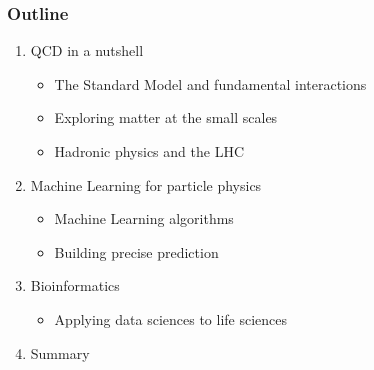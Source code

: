 \documentclass[aspectratio=43]{beamer}
\begin{document}
\begin{frame}

	\frametitle{Outline}
	
	\begin{enumerate}
		\item {\color{blue}QCD in a nutshell}
		\begin{itemize}
			\item The Standard Model and fundamental interactions
			\item Exploring matter at the small scales
			\item Hadronic physics and the LHC
		\end{itemize}
		\item {\color{blue}Machine Learning for particle physics}
		\begin{itemize}	
			\item Machine Learning algorithms
			\item Building precise prediction
		\end{itemize}	
		\item {\color{blue}Bioinformatics}
		\begin{itemize}
			\item Applying data sciences to life sciences
		\end{itemize}
		\item {\color{blue}Summary}
	\end{enumerate}
	
\end{frame}

\begin{frame}


\end{frame}
\end{document}
